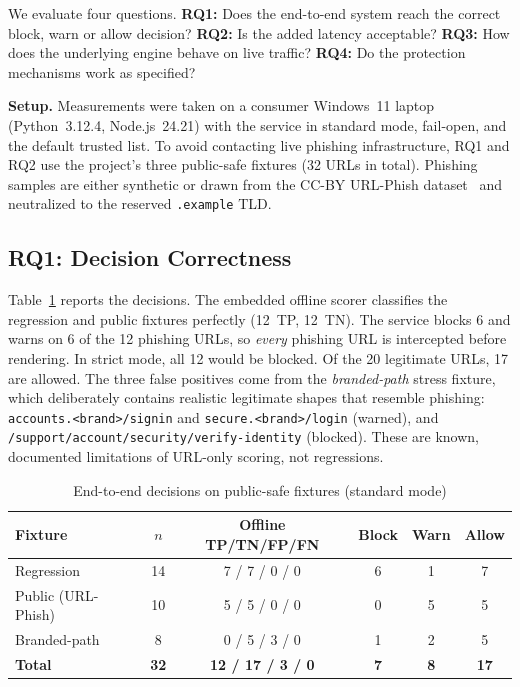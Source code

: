 \documentclass[conference]{IEEEtran}
\newcommand{\code}[1]{\texttt{\small #1}}
\begin{document}
We evaluate four questions. \textbf{RQ1:} Does the end-to-end system reach
the correct block, warn or allow decision? \textbf{RQ2:} Is the added latency
acceptable? \textbf{RQ3:} How does the underlying engine behave on live
traffic? \textbf{RQ4:} Do the protection mechanisms work as specified?

\textbf{Setup.} Measurements were taken on a consumer Windows~11 laptop
(Python~3.12.4, Node.js~24.21) with the service in standard mode, fail-open,
and the default trusted list. To avoid contacting live phishing
infrastructure, RQ1 and RQ2 use the project's three public-safe fixtures (32
URLs in total). Phishing samples are either synthetic or drawn from the
CC-BY URL-Phish dataset~\cite{urlphish} and neutralized to the reserved
\code{.example} TLD.

\subsection{RQ1: Decision Correctness}
Table~\ref{tab:decisions} reports the decisions. The embedded offline scorer
classifies the regression and public fixtures perfectly (12~TP, 12~TN). The
service blocks 6 and warns on 6 of the 12 phishing URLs, so \emph{every}
phishing URL is intercepted before rendering. In strict mode, all 12 would be
blocked. Of the 20 legitimate URLs, 17 are allowed. The three false positives
come from the \emph{branded-path} stress fixture, which deliberately contains
realistic legitimate shapes that resemble phishing:
\code{accounts.<brand>/signin} and \code{secure.<brand>/login} (warned), and
\code{/support/account/security/verify-identity} (blocked). These are known,
documented limitations of URL-only scoring, not regressions.

\begin{table}[t]
\centering
\caption{End-to-end decisions on public-safe fixtures (standard mode)}
\label{tab:decisions}
\setlength{\tabcolsep}{3.5pt}
\begin{tabular}{@{}lccccc@{}}
\toprule
Fixture & $n$ & Offline TP/TN/FP/FN & Block & Warn & Allow \\
\midrule
Regression        & 14 & 7 / 7 / 0 / 0 & 6 & 1 & 7 \\
Public (URL-Phish)& 10 & 5 / 5 / 0 / 0 & 0 & 5 & 5 \\
Branded-path      &  8 & 0 / 5 / 3 / 0 & 1 & 2 & 5 \\
\midrule
\textbf{Total}    & \textbf{32} & \textbf{12 / 17 / 3 / 0} & \textbf{7} & \textbf{8} & \textbf{17} \\
\bottomrule
\end{tabular}
\end{table}
\end{document}

